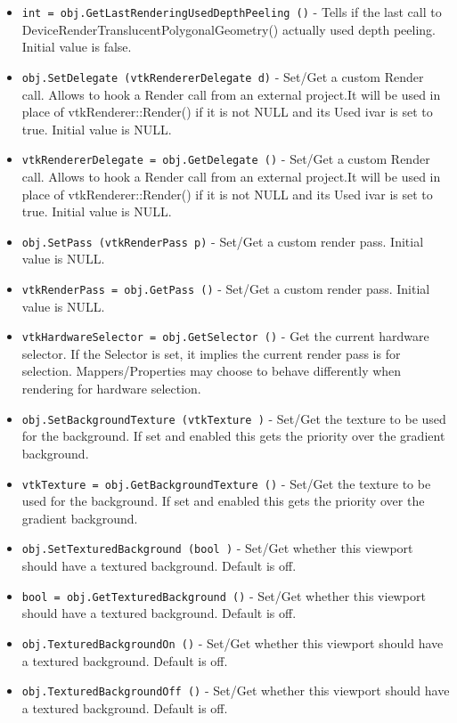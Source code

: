 \begin{itemize}
\item  \verb|int = obj.GetLastRenderingUsedDepthPeeling ()| -  Tells if the last call to DeviceRenderTranslucentPolygonalGeometry()
 actually used depth peeling.
 Initial value is false.

\item  \verb|obj.SetDelegate (vtkRendererDelegate d)| -  Set/Get a custom Render call. Allows to hook a Render call from an
 external project.It will be used in place of vtkRenderer::Render() if it
 is not NULL and its Used ivar is set to true.
 Initial value is NULL.

\item  \verb|vtkRendererDelegate = obj.GetDelegate ()| -  Set/Get a custom Render call. Allows to hook a Render call from an
 external project.It will be used in place of vtkRenderer::Render() if it
 is not NULL and its Used ivar is set to true.
 Initial value is NULL.

\item  \verb|obj.SetPass (vtkRenderPass p)| -  Set/Get a custom render pass.
 Initial value is NULL.

\item  \verb|vtkRenderPass = obj.GetPass ()| -  Set/Get a custom render pass.
 Initial value is NULL.

\item  \verb|vtkHardwareSelector = obj.GetSelector ()| -  Get the current hardware selector. If the Selector is set, it implies the
 current render pass is for selection. Mappers/Properties may choose to
 behave differently when rendering for hardware selection.

\item  \verb|obj.SetBackgroundTexture (vtkTexture )| -  Set/Get the texture to be used for the background. If set
 and enabled this gets the priority over the gradient background.

\item  \verb|vtkTexture = obj.GetBackgroundTexture ()| -  Set/Get the texture to be used for the background. If set
 and enabled this gets the priority over the gradient background.

\item  \verb|obj.SetTexturedBackground (bool )| -  Set/Get whether this viewport should have a textured background.
 Default is off.

\item  \verb|bool = obj.GetTexturedBackground ()| -  Set/Get whether this viewport should have a textured background.
 Default is off.

\item  \verb|obj.TexturedBackgroundOn ()| -  Set/Get whether this viewport should have a textured background.
 Default is off.

\item  \verb|obj.TexturedBackgroundOff ()| -  Set/Get whether this viewport should have a textured background.
 Default is off.

\end{itemize}
